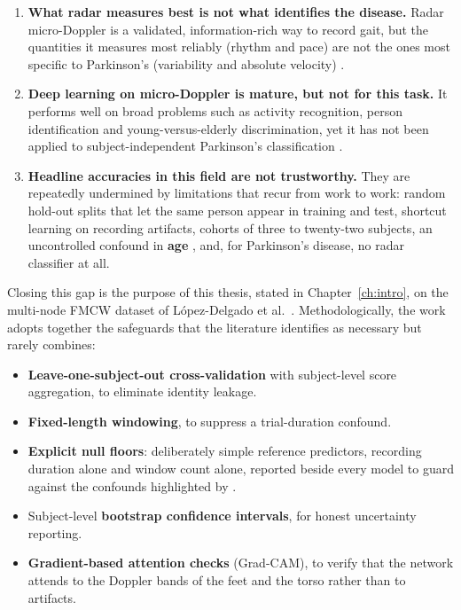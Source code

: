\begin{enumerate}
  \item \textbf{What radar measures best is not what identifies the
        disease.} Radar micro-Doppler is a validated, information-rich way to
        record gait, but the quantities it measures most reliably (rhythm and
        pace) are not the ones most specific to Parkinson's (variability and
        absolute velocity) \cite{seifert2020,gurbuz2024}.

  \item \textbf{Deep learning on micro-Doppler is mature, but not for this
        task.} It performs well on broad problems such as activity recognition,
        person identification and young-versus-elderly discrimination, yet it has
        not been applied to subject-independent Parkinson's classification
        \cite{hayashi2021,papanastasiou2020,ni2020,lopezdelgado2026}.

  \item \textbf{Headline accuracies in this field are not trustworthy.} They are
        repeatedly undermined by limitations that recur from work to work: random
        hold-out splits that let the same person appear in training and test,
        shortcut learning on recording artifacts, cohorts of three to
        twenty-two subjects, an uncontrolled confound in \textbf{age}
        \cite{hayashi2021}, and, for Parkinson's disease, no radar classifier
        at all.
\end{enumerate}

\noindent Closing this gap is the purpose of this thesis, stated in
Chapter~\ref{ch:intro}, on the multi-node FMCW dataset of López-Delgado et al.\
\cite{lopezdelgado2026}. Methodologically, the work adopts together the
safeguards that the literature identifies as necessary but rarely combines:

\begin{itemize}
  \item \textbf{Leave-one-subject-out cross-validation} with subject-level score
        aggregation, to eliminate identity leakage.
  \item \textbf{Fixed-length windowing}, to suppress a trial-duration confound.
  \item \textbf{Explicit null floors}: deliberately simple reference
        predictors, recording duration alone and window count alone,
        reported beside every model to guard against the confounds
        highlighted by \cite{hayashi2021}.
  \item Subject-level \textbf{bootstrap confidence intervals}, for honest
        uncertainty reporting.
  \item \textbf{Gradient-based attention checks} (Grad-CAM), to verify that the
        network attends to the Doppler bands of the feet and the torso rather
        than to artifacts.
\end{itemize}

